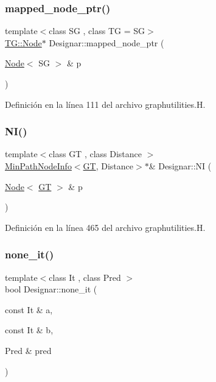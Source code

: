 \subsubsection{\texorpdfstring{mapped\+\_\+node\+\_\+ptr()}{mapped\_node\_ptr()}}
{\footnotesize\ttfamily template$<$class SG , class TG  = SG$>$ \\
\hyperlink{test-mtreenode_8_c_a17a24b0725f59987143c5faf63c4dc6f}{T\+G\+::\+Node}$\ast$ Designar\+::mapped\+\_\+node\+\_\+ptr (\begin{DoxyParamCaption}\item[{\hyperlink{namespace_designar_a5af326c65aa2bd26b26c410f2030d09e}{Node}$<$ SG $>$ \&}]{p }\end{DoxyParamCaption})}



Definición en la línea 111 del archivo graphutilities.\+H.

\mbox{\label{namespace_designar_aa80d7cfe1f0b0822f8e1bf21d4c9b5bf}} 
\subsubsection{\texorpdfstring{N\+I()}{NI()}}
{\footnotesize\ttfamily template$<$class GT , class Distance $>$ \\
\hyperlink{class_designar_1_1_min_path_node_info}{Min\+Path\+Node\+Info}$<$\hyperlink{demo-buildgraph_8_c_a3001c40d2c31ca87ed96cd7d1334a55e}{GT}, Distance$>$$\ast$\& Designar\+::\+NI (\begin{DoxyParamCaption}\item[{\hyperlink{namespace_designar_a5af326c65aa2bd26b26c410f2030d09e}{Node}$<$ \hyperlink{demo-buildgraph_8_c_a3001c40d2c31ca87ed96cd7d1334a55e}{GT} $>$ \&}]{p }\end{DoxyParamCaption})\hspace{0.3cm}{\ttfamily [inline]}}



Definición en la línea 465 del archivo graphutilities.\+H.

\mbox{\label{namespace_designar_a1f6b851accb92e3589c88a4c75061588}} 
\subsubsection{\texorpdfstring{none\+\_\+it()}{none\_it()}\hspace{0.1cm}{\footnotesize\ttfamily [1/2]}}
{\footnotesize\ttfamily template$<$class It , class Pred $>$ \\
bool Designar\+::none\+\_\+it (\begin{DoxyParamCaption}\item[{const It \&}]{a,  }\item[{const It \&}]{b,  }\item[{Pred \&}]{pred }\end{DoxyParamCaption})}



